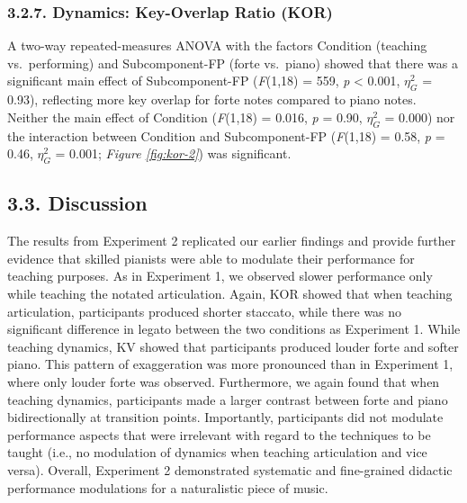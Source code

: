 \documentclass[
  english,
  man,floatsintext]{apa6}
\begin{document}
\hypertarget{dynamics-key-overlap-ratio-kor}{%
\subsubsection{3.2.7. Dynamics: Key-Overlap Ratio (KOR)}\label{dynamics-key-overlap-ratio-kor}}

A two-way repeated-measures ANOVA with the factors Condition (teaching vs.~performing) and Subcomponent-FP (forte vs.~piano) showed that there was a significant main effect of Subcomponent-FP (\emph{F}(1,18) = 559, \emph{p} \textless{} 0.001, \(\eta_G^2\) = 0.93), reflecting more key overlap for forte notes compared to piano notes. Neither the main effect of Condition (\emph{F}(1,18) = 0.016, \emph{p} = 0.90, \(\eta_G^2\) = 0.000) nor the interaction between Condition and Subcomponent-FP (\emph{F}(1,18) = 0.58, \emph{p} = 0.46, \(\eta_G^2\) = 0.001; \emph{Figure \ref{fig:kor-2}}) was significant.

\hypertarget{discussion-1}{%
\subsection{3.3. Discussion}\label{discussion-1}}

The results from Experiment 2 replicated our earlier findings and provide further evidence that skilled pianists were able to modulate their performance for teaching purposes. As in Experiment 1, we observed slower performance only while teaching the notated articulation. Again, KOR showed that when teaching articulation, participants produced shorter staccato, while there was no significant difference in legato between the two conditions as Experiment 1. While teaching dynamics, KV showed that participants produced louder forte and softer piano. This pattern of exaggeration was more pronounced than in Experiment 1, where only louder forte was observed. Furthermore, we again found that when teaching dynamics, participants made a larger contrast between forte and piano bidirectionally at transition points. Importantly, participants did not modulate performance aspects that were irrelevant with regard to the techniques to be taught (i.e., no modulation of dynamics when teaching articulation and vice versa). Overall, Experiment 2 demonstrated systematic and fine-grained didactic performance modulations for a naturalistic piece of music.
\end{document}

